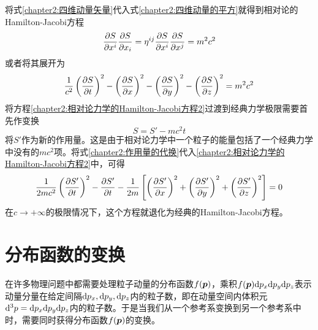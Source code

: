 将式\eqref{chapter2:四维动量矢量}代入式\eqref{chapter2:四维动量的平方}就得到相对论的Hamilton-Jacobi方程
\begin{equation}
	\frac{\partial S}{\partial x^i} \frac{\partial S}{\partial x_i} = \eta^{ij} \frac{\partial S}{\partial x^i}\frac{\partial S}{\partial x^j} = m^2c^2
	\label{chapter2:相对论力学的Hamilton-Jacobi方程}
\end{equation}
或者将其展开为
\begin{equation}
	\frac{1}{c^2}\left(\frac{\partial S}{\partial t}\right)^2 - \left(\frac{\partial S}{\partial x}\right)^2 - \left(\frac{\partial S}{\partial y}\right)^2 - \left(\frac{\partial S}{\partial z}\right)^2 = m^2c^2
	\label{chapter2:相对论力学的Hamilton-Jacobi方程2}
\end{equation}
将方程\eqref{chapter2:相对论力学的Hamilton-Jacobi方程2}过渡到经典力学极限需要首先作变换
\begin{equation}
	S = S'-mc^2t
	\label{chapter2:作用量的代换}
\end{equation}
将$S'$作为新的作用量。这是由于相对论力学中一个粒子的能量包括了一个经典力学中没有的$mc^2$项。将式\eqref{chapter2:作用量的代换}代入\eqref{chapter2:相对论力学的Hamilton-Jacobi方程2}中，可得
\begin{equation*}
	\frac{1}{2mc^2} \left(\frac{\partial S'}{\partial t}\right)^2 - \frac{\partial S'}{\partial t} - \frac{1}{2m}\left[\left(\frac{\partial S'}{\partial x}\right)^2 + \left(\frac{\partial S'}{\partial y}\right)^2 + \left(\frac{\partial S'}{\partial z}\right)^2\right] = 0
\end{equation*}
在$c\to +\infty$的极限情况下，这个方程就退化为经典的Hamilton-Jacobi方程。

\section{分布函数的变换}

在许多物理问题中都需要处理粒子动量的分布函数$f(\boldsymbol{p})$，乘积$f(\boldsymbol{p})\mathrm{d} p_x\mathrm{d} p_y\mathrm{d} p_z$表示动量分量在给定间隔$\mathrm{d} p_x, \mathrm{d} p_y, \mathrm{d} p_z$内的粒子数，即在动量空间内体积元$\mathrm{d}^3p = \mathrm{d} p_x\mathrm{d} p_y \mathrm{d} p_z$内的粒子数。于是当我们从一个参考系变换到另一个参考系中时，需要同时获得分布函数$f(\boldsymbol{p})$的变换。

